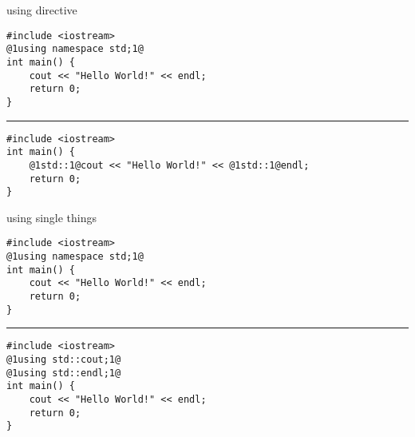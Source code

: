 \begin{frame}[fragile,label=using]{using directive}
\begin{lstlisting}
#include <iostream>
@1using namespace std;1@
int main() {
    cout << "Hello World!" << endl;
    return 0;
}
\end{lstlisting}
\hrule
\begin{lstlisting}
#include <iostream>
int main() {
    @1std::1@cout << "Hello World!" << @1std::1@endl;
    return 0;
}
\end{lstlisting}
\end{frame}

\begin{frame}[fragile,label=usingSingle]{using single things}
\begin{lstlisting}
#include <iostream>
@1using namespace std;1@
int main() {
    cout << "Hello World!" << endl;
    return 0;
}
\end{lstlisting}
\hrule
\begin{lstlisting}
#include <iostream>
@1using std::cout;1@
@1using std::endl;1@
int main() {
    cout << "Hello World!" << endl;
    return 0;
}
\end{lstlisting}
\end{frame}
